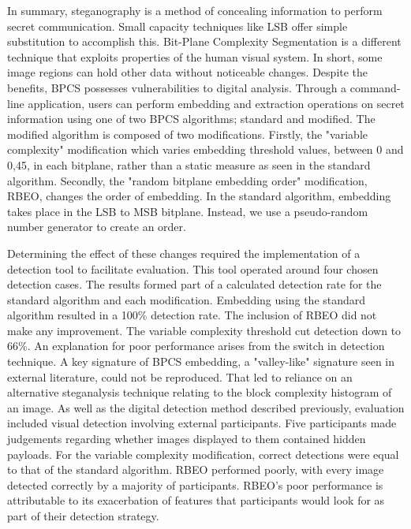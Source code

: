 \documentclass{l4proj}
\begin{document}
In summary, steganography is a method of concealing information to perform secret communication. Small capacity techniques like LSB offer simple substitution to accomplish this. Bit-Plane Complexity Segmentation is a different technique that exploits properties of the human visual system. In short, some image regions can hold other data without noticeable changes. Despite the benefits, BPCS possesses vulnerabilities to digital analysis. Through a command-line application, users can perform embedding and extraction operations on secret information using one of two BPCS algorithms; standard and modified. The modified algorithm is composed of two modifications. Firstly, the "variable complexity" modification which varies embedding threshold values, between 0 and 0,45, in each bitplane, rather than a static measure as seen in the standard algorithm. Secondly, the "random bitplane embedding order" modification, RBEO, changes the order of embedding. In the standard algorithm, embedding takes place in the LSB to MSB bitplane. Instead, we use a pseudo-random number generator to create an order.

Determining the effect of these changes required the implementation of a detection tool to facilitate evaluation. This tool operated around four chosen detection cases. The results formed part of a calculated detection rate for the standard algorithm and each modification. Embedding using the standard algorithm resulted in a 100\% detection rate. The inclusion of RBEO did not make any improvement. The variable complexity threshold cut detection down to 66\%. An explanation for poor performance arises from the switch in detection technique. A key signature of BPCS embedding, a "valley-like" signature seen in external literature, could not be reproduced. That led to reliance on an alternative steganalysis technique relating to the block complexity histogram of an image. As well as the digital detection method described previously, evaluation included visual detection involving external participants. Five participants made judgements regarding whether images displayed to them contained hidden payloads. For the variable complexity modification, correct detections were equal to that of the standard algorithm. RBEO performed poorly, with every image detected correctly by a majority of participants. RBEO's poor performance is attributable to its exacerbation of features that participants would look for as part of their detection strategy.
\end{document}
